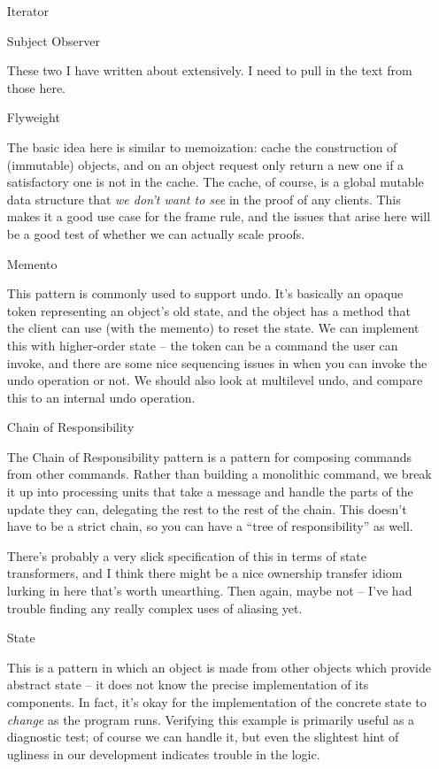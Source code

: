\begin{itemize}
\item[Iterator]
\item[Subject Observer]

These two I have written about extensively. I need to pull in the text
from those here.

\item[Flyweight]

The basic idea here is similar to memoization: cache the construction
of (immutable) objects, and on an object request only return a new one
if a satisfactory one is not in the cache. The cache, of course, is a
global mutable data structure that \emph{we don't want to see} in the
proof of any clients. This makes it a good use case for the frame
rule, and the issues that arise here will be a good test of whether we
can actually scale proofs.

\item[Memento]

This pattern is commonly used to support undo. It's basically an
opaque token representing an object's old state, and the object has a
method that the client can use (with the memento) to reset the state.
We can implement this with higher-order state -- the token can be a
command the user can invoke, and there are some nice sequencing issues
in when you can invoke the undo operation or not. We should also look
at multilevel undo, and compare this to an internal undo operation.

\item[Chain of Responsibility]

The Chain of Responsibility pattern is a pattern for composing
commands from other commands. Rather than building a monolithic
command, we break it up into processing units that take a message and
handle the parts of the update they can, delegating the rest to the
rest of the chain. This doesn't have to be a strict chain, so you can
have a ``tree of responsibility'' as well.

There's probably a very slick specification of this in terms of state
transformers, and I think there might be a nice ownership transfer
idiom lurking in here that's worth unearthing. Then again, maybe not
-- I've had trouble finding any really complex uses of aliasing yet.

\item[State]

This is a pattern in which an object is made from other objects which
provide abstract state -- it does not know the precise implementation
of its components. In fact, it's okay for the implementation of the
concrete state to \emph{change} as the program runs. Verifying this
example is primarily useful as a diagnostic test; of course we can
handle it, but even the slightest hint of ugliness in our development
indicates trouble in the logic.


\end{itemize}
